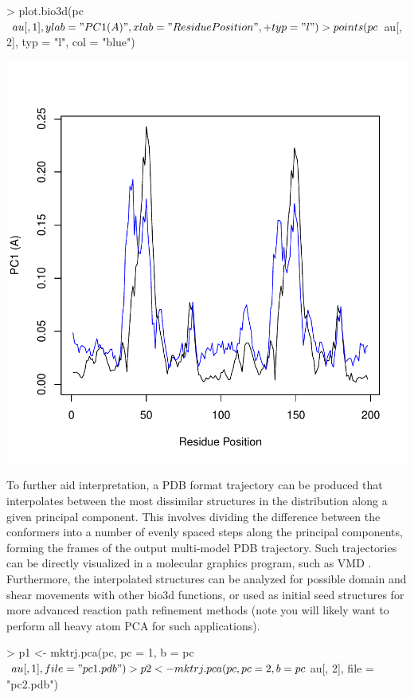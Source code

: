 \documentclass[letter]{article}
\begin{document}
\begin{Schunk}
\begin{Sinput}
> plot.bio3d(pc$au[, 1], ylab = "PC1 (A)", xlab = "Residue Position", 
+     typ = "l")
> points(pc$au[, 2], typ = "l", col = "blue")
\end{Sinput}
\end{Schunk}
\includegraphics{Bio3D_trajectory-014}

To further aid interpretation, a PDB format trajectory can be produced that interpolates between the most dissimilar structures in the distribution along a given principal component.  This involves dividing the difference between the conformers into a number of evenly spaced steps along the principal components, forming the frames of the output multi-model PDB trajectory. Such trajectories can be directly visualized in a molecular graphics program, such as VMD \citep{vmd}. Furthermore, the interpolated structures can be analyzed for possible domain and shear movements with other bio3d functions, or used as initial seed structures for more advanced reaction path refinement methods (note you will likely want to perform all heavy atom PCA for such applications).
\begin{Schunk}
\begin{Sinput}
> p1 <- mktrj.pca(pc, pc = 1, b = pc$au[, 1], file = "pc1.pdb")
> p2 <- mktrj.pca(pc, pc = 2, b = pc$au[, 2], file = "pc2.pdb")
\end{Sinput}
\end{Schunk}
\end{document}
